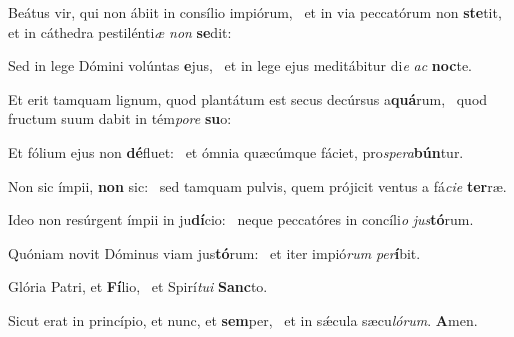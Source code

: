 \item Beátus vir, qui non ábiit in consílio impiórum,~\pscross{} et in via peccatórum non \textbf{ste}tit,~\psstar{} et in cáthedra pestilénti\textit{æ} \textit{non} \textbf{se}dit:
\item Sed in lege Dómini volúntas \textbf{e}jus,~\psstar{} et in lege ejus meditábitur di\textit{e} \textit{ac} \textbf{noc}te.
\item Et erit tamquam lignum, quod plantátum est secus decúrsus a\textbf{quá}rum,~\psstar{} quod fructum suum dabit in tém\textit{po}\textit{re} \textbf{su}o:
\item Et fólium ejus non \textbf{dé}fluet:~\psstar{} et ómnia quæcúmque fáciet, pro\textit{spe}\textit{ra}\textbf{bún}tur.
\item Non sic ímpii, \textbf{non} sic:~\psstar{} sed tamquam pulvis, quem prójicit ventus a fá\textit{ci}\textit{e} \textbf{ter}ræ.
\item Ideo non resúrgent ímpii in ju\textbf{dí}cio:~\psstar{} neque peccatóres in concíli\textit{o} \textit{jus}\textbf{tó}rum.
\item Quóniam novit Dóminus viam jus\textbf{tó}rum:~\psstar{} et iter impió\textit{rum} \textit{per}\textbf{í}bit.
\item Glória Patri, et \textbf{Fí}lio,~\psstar{} et Spirí\textit{tu}\textit{i} \textbf{Sanc}to.
\item Sicut erat in princípio, et nunc, et \textbf{sem}per,~\psstar{} et in sǽcula sæcu\textit{ló}\textit{rum}. \textbf{A}men.
